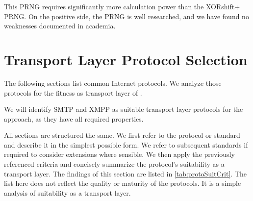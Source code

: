 This PRNG requires significantly more calculation power than the XORshift+ PRNG. On the positive side, the PRNG is well researched, and we have found no weaknesses documented in academia.


\section{Transport Layer Protocol Selection}\label{sec:transportProtocols}
The following sections list common Internet protocols. We analyze those protocols for the fitness as transport layer of \MessageVortex. 

We will identify SMTP and XMPP as suitable transport layer protocols for the \MessageVortex{} approach, as they have all required properties.

All sections are structured the same. We first refer to the protocol or standard and describe it in the simplest possible form. We refer to subsequent standards if required to consider extensions where sensible. We then apply the previously referenced criteria and concisely summarize the protocol's suitability as a transport layer. The findings of this section are listed in \cref{tab:protoSuitCrit}. The list here does not reflect the quality or maturity of the protocols. It is a simple analysis of suitability as a transport layer.

